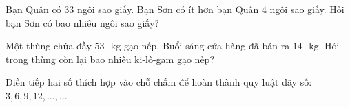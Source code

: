 \begin{bt}[1,5 điểm]
Bạn Quân có $33$ ngôi sao giấy. Bạn Sơn có ít hơn bạn Quân $4$ ngôi sao giấy. Hỏi bạn Sơn có bao nhiêu ngôi sao giấy?
\end{bt}

\begin{bt}[1,0 điểm]
Một thùng chứa đầy $53\text{ }\text{kg}$ gạo nếp. Buổi sáng cửa hàng đã bán ra $14\text{ }\text{kg}$. Hỏi trong thùng còn lại bao nhiêu ki-lô-gam gạo nếp?
\end{bt}

\begin{bt}[1,0 điểm]
Điền tiếp hai số thích hợp vào chỗ chấm để hoàn thành quy luật dãy số: $3, 6, 9, 12, \dots, \dots$
\end{bt}
